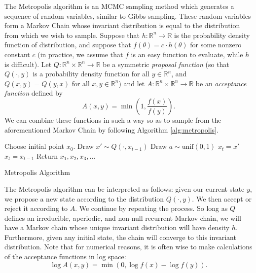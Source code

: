 The Metropolis algorithm is an MCMC sampling method which generates a sequence of random variables, similar to Gibbs sampling.
These random variables form a Markov Chain whose invariant distribution is equal to the distribution from which we wish
to sample. Suppose that $h : \mathbb{R}^n \rightarrow \mathbb{R}$ is the probability density function of distribution,
and suppose that $f(\theta) = c \cdot h(\theta)$ for some nonzero constant $c$ (in practice, we assume that $f$ is an easy
function to evaluate, while $h$ is difficult). Let $Q : \mathbb{R}^n \times \mathbb{R}^n \rightarrow \mathbb{R}$ be
a symmetric \emph{proposal function}
(so that $Q(\cdot, y)$ is a probability density function for all $y \in \mathbb{R}^n$,
 and $Q(x,y) = Q(y,x)$ for all $x,y \in \mathbb{R}^n$) and let
 $A : \mathbb{R}^n \times \mathbb{R}^n \rightarrow \mathbb{R}$ be an \emph{acceptance function} defined by
\[
A(x,y) = \min\left(1, \frac{f(x)}{f(y)}\right).
\]
We can combine these functions in such a way so as to sample from the aforementioned Markov Chain by following Algorithm \ref{alg:metropolis}.
\begin{algorithm}
\begin{algorithmic}[1]
    \State \textrm{Choose initial point } $x_0$.
        \State \textrm{Draw } $x' \sim Q(\cdot, x_{t-1})$
        \State \textrm{Draw } $a \sim \text{unif}(0,1)$
            \State $x_t = x'$
        \Else
            \State $x_t = x_{t-1}$
        \EndIf
    \EndFor
    \State \textrm{Return } $x_1,x_2,x_3,\ldots$
\EndProcedure
\end{algorithmic}
\caption{Metropolis Algorithm}
\label{alg:metropolis}
\end{algorithm}
The Metropolis algorithm can be interpreted as follows:
given our current state $y$, we propose a new state according to the distribution $Q(\cdot, y)$. We then accept or reject it according to $A$.  We continue by repeating the process. So long as $Q$ defines an irreducible, aperiodic, and non-null recurrent Markov chain, we will have a Markov chain whose unique invariant distribution will have density $h$. Furthermore, given any initial state, the chain will converge to this invariant distribution.
Note that for numerical reasons, it is often wise to make calculations of the acceptance functions in log space:
\[
\log A(x,y) = \min(0, \log f(x) - \log f(y)).
\]


